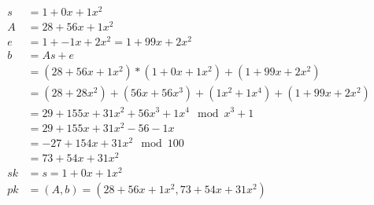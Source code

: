 \begin{align*}
  s  & = 1 + 0x + 1x^2                                                   \\
  A  & = 28 + 56x + 1x^2                                                 \\
  e  & = 1 + -1x + 2x^2= 1 + 99x + 2x^2                                  \\
  b  & = As + e                                                          \\
     & = (28 + 56x + 1x^2)*(1 + 0x + 1x^2) + (1 + 99x + 2x^2)            \\
     & = (28 + 28x^2) + (56x + 56x^3) + (1x^2 + 1x^4) + (1 + 99x + 2x^2) \\
     & = 29 + 155x + 31x^2 + 56x^3 + 1x^4 \mod x^3+1                     \\
     & = 29 + 155x + 31x^2 - 56 - 1x                                     \\
     & = -27 + 154x + 31x^2  \mod 100                                    \\
     & = 73 + 54x + 31x^2                                                \\
  sk & = s =1 + 0x + 1x^2                                                \\
  pk & = (A, b) = (28 + 56x + 1x^2, 73 + 54x + 31x^2)                    \\
\end{align*}


